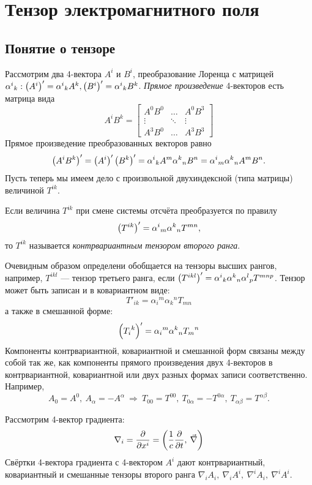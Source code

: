 \newpage
\section{Тензор электромагнитного поля}
\subsection{Понятие о тензоре}
    Рассмотрим два 4-вектора $A^i$ и $B^i$, преобразование Лоренца с матрицей 
    ${\alpha^i}_k : \left({A^i}\right)' = {\alpha^i}_k A^k, \left({B^i}\right)' = {\alpha^i}_kB^k$.
    \textit{Прямое произведение} 4-векторов есть матрица вида
    \[
        A^iB^k = \begin{bmatrix}
            A^0B^0 & \dots & A^0B^3 \\
            \vdots & \ddots & \vdots \\
            A^3B^0 & \dots & A^3B^3
        \end{bmatrix}
    \]
    Прямое произведение преобразованных векторов равно
    \[
        \left({A^iB^k}\right)' = \left({A^i}\right)'\left({B^k}\right)' = {\alpha^i}_kA^m{\alpha^k}_nB^n = 
        {\alpha^i}_m{\alpha^k}_nA^mB^n.
    \]
    Пусть теперь мы имеем дело с произвольной двухиндексной (типа матрицы) величиной $T^{ik}$.
    \begin{Def} Если величина $T^{ik}$  при смене системы отсчёта преобразуется по правилу
        \[
            \left({T^{ik}}\right)' = {\alpha^i}_m{\alpha^k}_n T^{mn},
        \]
        то $T^{ik}$ называется \textit{контрвариантным тензором второго ранга}.
    \end{Def}
    Очевидным образом определени обобщается на тензоры высших рангов, например, $T^{ikl}$ --- тензор третьего ранга, если
    $\left({T^{ikl}}\right)' = {\alpha^i}_k{\alpha^k}_n {\alpha^l}_p T^{mnp}$.
    Тензор может быть записан и в ковариантном виде:
    \[
        T'_{ik} = {\alpha_i}^m {\alpha_k}^nT_{mn}
    \]
    а также в смешанной форме:
    \[
        \left({{T_i}^k}\right)' = {\alpha_i}^m{\alpha^k}_n {T_m}^n
    \]
    Компоненты контрвариантной, ковариантной и смешанной форм связаны между собой так же, как компоненты прямого произведения двух 4-векторов
    в контрвариантной, ковариантной или двух разных формах записи соответственно. Например,
    \[
        A_0 = A^0,\: A_{\alpha} = -A^{\alpha} \: \Rightarrow \: T_{00} = T^{00},\: T_{0\alpha} = -T^{0\alpha},\: T_{\alpha\beta} = T^{\alpha\beta}.
    \]
    \begin{example}
        Рассмотрим 4-вектор градиента:
        \[
            \nabla_i = \frac{\partial}{\partial x^i} = \left({\frac{1}{c}\frac{\partial}{\partial t}, \: \vec{\nabla}}\right)
        \]
        Свёртки 4-вектора градиента с 4-вектором  $A^i$ дают контрвариантный, ковариантный и смешанные тензоры второго ранга 
        $\nabla_iA_i, \: \nabla_iA^i,\: \nabla^iA_i,\: \nabla^iA^i$.
    \end{example}
